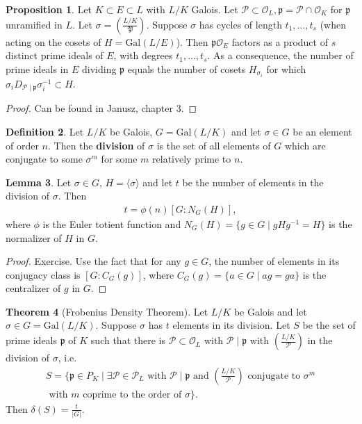 \documentclass{article}
\theoremstyle{definition}
\newtheorem{theorem}{Theorem}[section]
\newtheorem{lemma}[theorem]{Lemma}
\newtheorem{prop}[theorem]{Proposition}
\newtheorem{defn}[theorem]{Definition}
\begin{document}
\begin{prop}\label{prop3.8}
    Let $K \subset E \subset L$ with $L/K$ Galois. Let $\mathcal{P} \subset \mathcal{O}_L, \mathfrak{p} = \mathcal{P} \cap \mathcal{O}_K$ for $\mathfrak{p}$ unramified in $L$. Let $\sigma = \left(\frac{L/K}{\mathfrak{P}}\right)$. Suppose $\sigma$ has cycles of length $t_1,\ldots,t_s$ (when acting on the cosets of $H = \text{Gal}(L/E)$). Then $\mathfrak{p}\mathcal{O}_E$ factors as a product of $s$ distinct prime ideals of $E$, with degrees $t_1,\ldots,t_s$. As a consequence, the number of prime ideals in $E$ dividing $\mathfrak{p}$ equals the number of cosets $H_{\sigma_i}$ for which $\sigma_i D_{\mathcal{P}\mid \mathfrak{p}}\sigma_i^{-1} \subset H$.
\end{prop}
\begin{proof}
    Can be found in Janusz, chapter 3.
\end{proof}
\begin{defn}\label{defn3.9}
    Let $L/K$ be Galois, $G = \text{Gal}(L/K)$ and let $\sigma \in G$ be an element of order $n$. Then the \textbf{division} of $\sigma$ is the set of all elements of $G$ which are conjugate to some $\sigma^m$ for some $m$ relatively prime to $n$.
\end{defn}
\begin{lemma}\label{lemma3.10}
    Let $\sigma \in G$, $H = \langle \sigma \rangle$ and let $t$ be the number of elements in the division of $\sigma$. Then 
    \begin{align*}
        t = \phi(n) [G:N_G(H)],
    \end{align*}
    where $\phi$ is the Euler totient function and $N_G(H) = \{g \in G \mid g H g^{-1} = H\}$ is the normalizer of $H$ in $G$.
\end{lemma}
\begin{proof}
    Exercise. Use the fact that for any $g \in G$, the number of elements in its conjugacy class is $[G:C_G(g)]$, where $C_G(g) = \{a \in G \mid ag=ga\}$ is the centralizer of $g$ in $G$.
\end{proof}
\begin{theorem}[Frobenius Density Theorem]\label{theorem3.11}
    Let $L/K$ be Galois and let $\sigma \in G = \text{Gal}(L/K)$. Suppose $\sigma$ has $t$ elements in its division. Let $S$ be the set of prime ideals $\mathfrak{p}$ of $K$ such that there is $\mathcal{P} \subset \mathcal{O}_L$ with $\mathcal{P} \mid \mathfrak{p}$ with $\left(\frac{L/K}{\mathcal{P}}\right)$ in the division of $\sigma$, i.e. 
    \begin{align*}
        S = \{\mathfrak{p} \in P_K \mid \exists \mathcal{P} \in \mathcal{P}_L \text{ with }\mathcal{P}\mid \mathfrak{p} \text{ and }\left(\frac{L/K}{\mathcal{P}}\right) \text{ conjugate to }\sigma^m \\
    \text{ with }m \text{ coprime to the order of }\sigma\}.
    \end{align*}
    Then $\delta(S) = \frac{t}{\left|G\right|}$.
\end{theorem}
\end{document}
